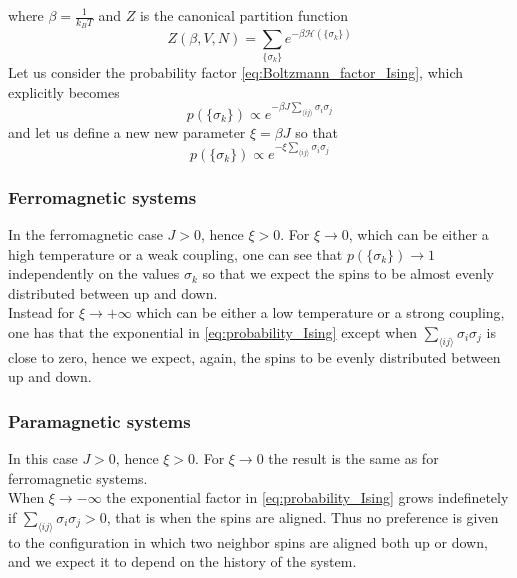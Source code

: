 where $\beta = \frac{1}{k_BT}$ and $Z$ is the canonical partition function
\begin{equation*}
    Z(\beta, V, N) = \sum_{\{\sigma_k\}} e^{-\beta\mathcal{H}(\{\sigma_k\})}
\end{equation*}
Let us consider the probability factor \ref{eq:Boltzmann_factor_Ising}, which explicitly becomes 
\begin{equation*}
    p(\{\sigma_k\}) \propto e^{-\beta J \sum_{\langle i j\rangle}\sigma_{i} \sigma_{j}}
\end{equation*}
and let us define a new new parameter $\xi = \beta J$ so that 
\begin{equation}
    p(\{\sigma_k\}) \propto e^{-\xi \sum_{\langle i j\rangle}\sigma_{i} \sigma_{j}}
    \label{eq:probability_Ising}
\end{equation}

\subsubsection*{Ferromagnetic systems}
In the ferromagnetic case $J > 0$, hence $\xi > 0$. For $\xi \to 0$, which can be either a high temperature or a weak coupling, one can see that 
$p(\{\sigma_k\}) \to 1$ independently on the values $\sigma_k$ so that we expect the spins to be almost evenly distributed between up and down. \\
Instead for $\xi \to +\infty$ which can be either a low temperature or a strong coupling, one has that the exponential in \ref{eq:probability_Ising} except when
$\sum_{\langle i j\rangle}\sigma_{i} \sigma_{j}$ is close to zero, hence we expect, again, the spins to be evenly distributed between up and down.
\subsubsection*{Paramagnetic systems}
In this case $J > 0$, hence $\xi > 0$. For $\xi \to 0$ the result is the same as for ferromagnetic systems. \\
When $\xi \to -\infty$ the exponential factor in \ref{eq:probability_Ising} grows indefinetely if $\sum_{\langle i j\rangle}\sigma_{i} \sigma_{j} > 0$, that is when the spins are aligned.
Thus no preference is given to the configuration in which two neighbor spins are aligned both up or down, and we expect it to depend on the history of the system. \\

